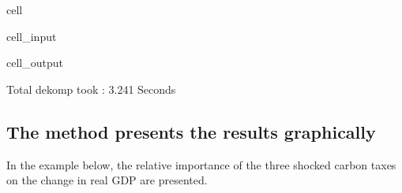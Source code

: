 \documentclass[letterpaper,10pt,english]{jupyterBook}
\begin{document}
\begin{sphinxuseclass}{cell}\begin{sphinxVerbatimInput}

\begin{sphinxuseclass}{cell_input}
\begin{sphinxVerbatim}[commandchars=\\\{\}]
   
\end{sphinxVerbatim}

\end{sphinxuseclass}\end{sphinxVerbatimInput}
\begin{sphinxVerbatimOutput}

\begin{sphinxuseclass}{cell_output}
\begin{sphinxVerbatim}[commandchars=\\\{\}]
Total dekomp took       :         3.241 Seconds
\end{sphinxVerbatim}

\end{sphinxuseclass}\end{sphinxVerbatimOutput}

\end{sphinxuseclass}

\subsection{The method  presents the results graphically}
\label{\detokenize{content/06_ModelAnalytics/AttributionSomeFeatures:the-method-explain-all-presents-the-results-graphically}}
\sphinxAtStartPar
In the example below, the relative importance of the three shocked carbon taxes on the change in real GDP are presented.
\end{document}
